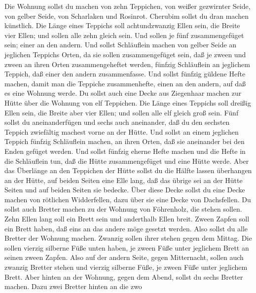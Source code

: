  Die Wohnung sollst du machen von zehn Teppichen, von weißer
gezwirnter Seide, von gelber Seide, von Scharlaken und Rosinrot.
Cherubim sollst du dran machen künstlich.  Die Länge eines
Teppichs soll achtundzwanzig Ellen sein, die Breite vier Ellen; und
sollen alle zehn gleich sein.  Und sollen je fünf
zusammengefüget sein; einer an den andern.  Und sollst
Schläuflein machen von gelber Seide an jeglichen Teppichs Orten, da sie
sollen zusammengefüget sein, daß je zween und zween an ihren Orten
zusammengeheftet werden,  fünfzig Schläuflein an jeglichem
Teppich, daß einer den andern zusammenfasse.  Und sollst
fünfzig güldene Hefte machen, damit man die Teppiche zusammenhefte,
einen an den andern, auf daß es eine Wohnung werde.  Du
sollst auch eine Decke aus Ziegenhaar machen zur Hütte über die Wohnung
von elf Teppichen.  Die Länge eines Teppichs soll dreißig
Ellen sein, die Breite aber vier Ellen; und sollen alle elf gleich groß
sein.  Fünf sollst du aneinanderfügen und sechs auch
aneinander, daß du den sechsten Teppich zwiefältig machest vorne an der
Hütte.  Und sollst an einem jeglichen Teppich fünfzig
Schläuflein machen, an ihren Orten, daß sie aneinander bei den Enden
gefüget werden.  Und sollst fünfzig eherne Hefte machen und
die Hefte in die Schläuflein tun, daß die Hütte zusammengefüget und eine
Hütte werde.  Aber das Überlänge an den Teppichen der Hütte
sollst du die Hälfte lassen überhangen an der Hütte,  auf
beiden Seiten eine Elle lang, daß das übrige sei an der Hütte Seiten und
auf beiden Seiten sie bedecke.  Über diese Decke sollst du
eine Decke machen von rötlichen Widderfellen, dazu über sie eine Decke
von Dachsfellen.  Du sollst auch Bretter machen zu der
Wohnung von Föhrenholz, die stehen sollen.  Zehn Ellen lang
soll ein Brett sein und anderthalb Ellen breit.  Zween
Zapfen soll ein Brett haben, daß eins an das andere möge gesetzt werden.
Also sollst du alle Bretter der Wohnung machen.  Zwanzig
sollen ihrer stehen gegen dem Mittag.  Die sollen vierzig
silberne Füße unten haben, je zween Füße unter jeglichem Brett an seinen
zween Zapfen.  Also auf der andern Seite, gegen
Mitternacht, sollen auch zwanzig Bretter stehen  und
vierzig silberne Füße, je zween Füße unter jeglichem Brett.
 Aber hinten an der Wohnung, gegen dem Abend, sollst du
sechs Bretter machen.  Dazu zwei Bretter hinten an die zwo
